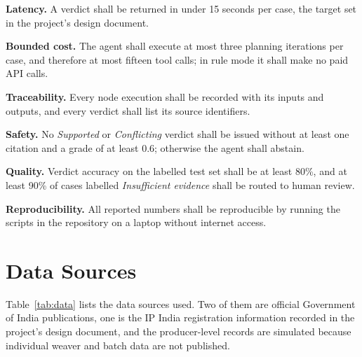 \begin{description}[leftmargin=1.6cm,style=nextline,itemsep=2pt]
\item[NFR1] \textbf{Latency.} A verdict shall be returned in under 15 seconds per case, the target set
in the project's design document.
\item[NFR2] \textbf{Bounded cost.} The agent shall execute at most three planning iterations per case,
and therefore at most fifteen tool calls; in rule mode it shall make no paid API calls.
\item[NFR3] \textbf{Traceability.} Every node execution shall be recorded with its inputs and outputs,
and every verdict shall list its source identifiers.
\item[NFR4] \textbf{Safety.} No \emph{Supported} or \emph{Conflicting} verdict shall be issued without at
least one citation and a grade of at least 0.6; otherwise the agent shall abstain.
\item[NFR5] \textbf{Quality.} Verdict accuracy on the labelled test set shall be at least 80\%, and at
least 90\% of cases labelled \emph{Insufficient evidence} shall be routed to human review.
\item[NFR6] \textbf{Reproducibility.} All reported numbers shall be reproducible by running the
scripts in the repository on a laptop without internet access.
\end{description}

\section{Data Sources}

Table~\ref{tab:data} lists the data sources used. Two of them are official Government of India
publications, one is the IP India registration information recorded in the project's design document,
and the producer-level records are simulated because individual weaver and batch data are not
published.

